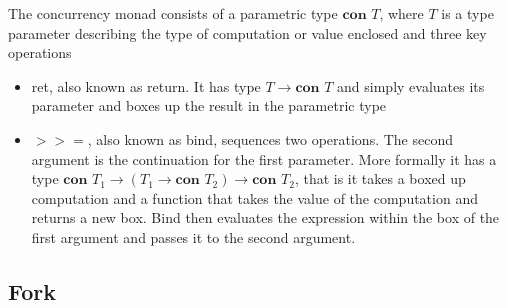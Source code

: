 \documentclass[12pt,twoside,notitlepage]{report}
\begin{document}
 The concurrency monad consists of a parametric type $  \textbf{con } T  $, where $ T $ is a type parameter describing the type of computation or value enclosed and three key operations 
\begin{itemize}
\item{ret, also known as return. It has type $ T \rightarrow \textbf{con }T   $ and simply evaluates its parameter and boxes up the result in the parametric type}
\item{$>>=$, also known as bind, sequences two operations. The second argument is the continuation for the first parameter. More formally it has a type $ \textbf{con } T_1  \rightarrow ( T_1 \rightarrow \textbf{con } T_2 ) \rightarrow \textbf{con } T_2  $, that is it takes a boxed up computation and a function that takes the value of the computation and returns a new box. Bind then evaluates the expression within the box of the first argument and passes it to the second argument.}

\end{itemize}

\subsection{Fork}
\end{document}
